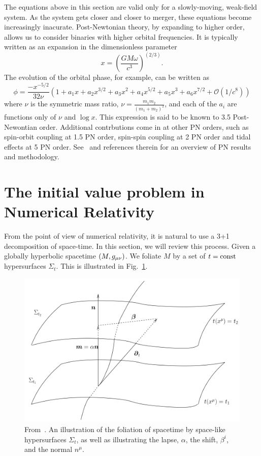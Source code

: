 The equations above in this section are valid only for a slowly-moving, weak-field system. As the system gets closer and closer to merger, these equations become increasingly inacurate. Post-Newtonian theory, by expanding to higher order, allows us to consider binaries with higher orbital frequencies. It is typically written as an expansion in the dimensionless parameter 
\begin{equation}
x=\left(\frac{GM\omega}{c^3}\right)^{(2/3)}.
\end{equation}
The evolution of the orbital phase, for example, can be written as
\begin{equation}
\phi=\frac{-x^{-5/2}}{32\nu}\left(1+a_1x + a_2x^{3/2} + a_3x^2 + a_4x^{5/2} + a_5x^3 + a_6x^{7/2}+\mathcal{O}(1/c^8)\right)
\end{equation}
where $\nu$ is the symmetric mass ratio, $\nu=\frac{m_1m_2}{(m_1+m_2)^2}$, and each of the $a_i$ are functions only of $\nu$ and $\log{x}$. This expression is said to be known to 3.5 Post-Newontian order. Additional contrbutions come in at other PN orders, such as spin-orbit coupling at 1.5 PN order, spin-spin coupling at 2 PN order and tidal effects at 5 PN order. See~\cite{Blanchet2006} and references therein for an overview of PN results and methodology.


\section{The initial value problem in Numerical Relativity}
\label{sec:IVP}
From the point of view of numerical relativity, it is natural to use a 3+1 decomposition of space-time. In this section, we will review this process. Given a globally hyperbolic spacetime $(M,g_{\mu\nu})$. We foliate $M$ by a set of $t={\rm const}$ hypersurfaces $\Sigma_t$. This is illustrated in Fig.~\ref{fig_Slice}.
\begin{center}
\begin{figure}[!ht]
\includegraphics[scale=0.45]{intro/Slice.png}
\caption[Illustration of the 3+1 decomposition.]{From~\cite{Cardoso2014}. An illustration of the foliation of spacetime by space-like hypersurfaces $\Sigma_t$, as well as illustrating the lapse, $\alpha$, the shift, $\beta^i$, and the normal $n^{\mu}$.}
\label{fig_Slice}
\end{figure}
\end{center}

